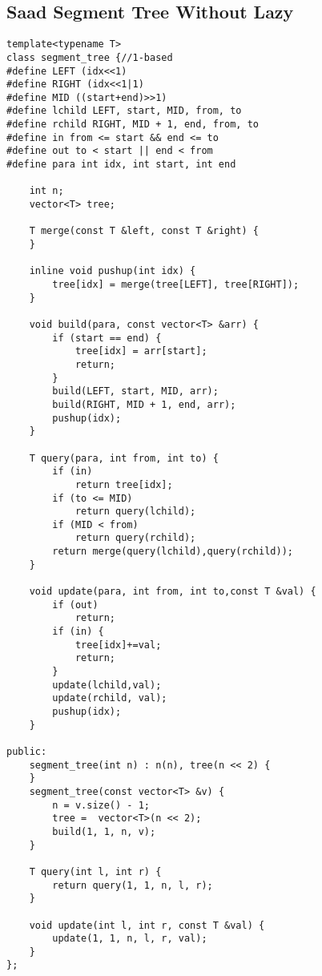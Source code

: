 \documentclass{article}
\begin{document}
\subsection{Saad Segment Tree Without Lazy}
\begin{verbatim}
template<typename T>
class segment_tree {//1-based
#define LEFT (idx<<1)
#define RIGHT (idx<<1|1)
#define MID ((start+end)>>1)
#define lchild LEFT, start, MID, from, to
#define rchild RIGHT, MID + 1, end, from, to
#define in from <= start && end <= to
#define out to < start || end < from
#define para int idx, int start, int end

    int n;
    vector<T> tree;

    T merge(const T &left, const T &right) {
    }
    
    inline void pushup(int idx) {
        tree[idx] = merge(tree[LEFT], tree[RIGHT]);
    }
    
    void build(para, const vector<T> &arr) {
        if (start == end) {
            tree[idx] = arr[start];
            return;
        }
        build(LEFT, start, MID, arr);
        build(RIGHT, MID + 1, end, arr);
        pushup(idx);
    }

    T query(para, int from, int to) {
        if (in)
            return tree[idx];
        if (to <= MID)
            return query(lchild);
        if (MID < from)
            return query(rchild);
        return merge(query(lchild),query(rchild));
    }

    void update(para, int from, int to,const T &val) {
        if (out)
            return;
        if (in) {
            tree[idx]+=val; 
            return;
        }
        update(lchild,val);
        update(rchild, val);
        pushup(idx);
    }

public:
    segment_tree(int n) : n(n), tree(n << 2) {
    }
    segment_tree(const vector<T> &v) {
        n = v.size() - 1;
        tree =  vector<T>(n << 2);
        build(1, 1, n, v);
    }

    T query(int l, int r) {
        return query(1, 1, n, l, r);
    }

    void update(int l, int r, const T &val) {
        update(1, 1, n, l, r, val);
    }
};
\end{verbatim}
\end{document}
